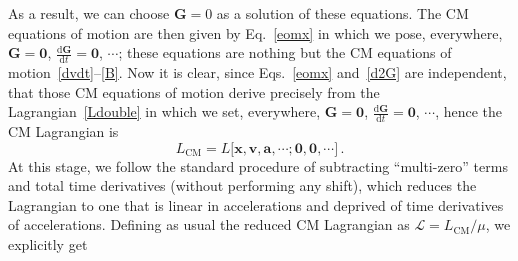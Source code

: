 \documentclass[prd,preprint,superscriptaddress,tightenlines,nofootinbib,
  eqsecnum,showpacs]{revtex4}
\newcommand{\ud}{\mathrm{d}}
\begin{document}
% 
As a result, we can choose $\bm{G}=0$ as a solution of these equations. The CM
equations of motion are then given by Eq.~\eqref{eomx} in which we pose,
everywhere, $\bm{G}=\bm{0}$, $\frac{\ud\bm{G}}{\ud t} = \bm{0}$, $\cdots$; these equations are nothing but the CM equations of motion~\eqref{dvdt}--\eqref{B}.
Now it is clear, since Eqs.~\eqref{eomx} and~\eqref{d2G} are independent, that
those CM equations of motion derive precisely from the
Lagrangian~\eqref{Ldouble} in which we set, everywhere, $\bm{G}=\bm{0}$,
$\frac{\ud\bm{G}}{\ud t} = \bm{0}$, $\cdots$, hence the CM Lagrangian is
%
\begin{equation}\label{LdoubleCM}
L_\text{CM} = L\bigl[\bm{x}, \bm{v}, \bm{a}, \cdots; \bm{0}, \bm{0}, \cdots\bigr]\,.
\end{equation} 
%
At this stage, we follow the standard procedure of subtracting
``multi-zero'' terms and total time derivatives (without performing any shift), which reduces the Lagrangian to one that is linear in accelerations and deprived of
time derivatives of accelerations. Defining as usual the reduced CM Lagrangian as
$\mathcal{L}=L_\text{CM}/\mu$, we explicitly get
%
\end{document}
